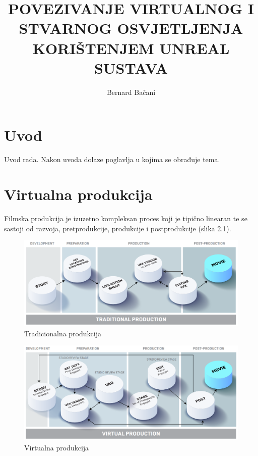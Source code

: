 \documentclass[times, utf8, zavrsni, numeric]{fer}
\begin{document}

\title{POVEZIVANJE VIRTUALNOG I STVARNOG OSVJETLJENJA KORIŠTENJEM UNREAL SUSTAVA}

\author{Bernard Bačani}

\maketitle

\izvornik


\tableofcontents

\chapter{Uvod}
Uvod rada. Nakon uvoda dolaze poglavlja u kojima se obrađuje tema.

\chapter{Virtualna produkcija}
Filmska produkcija je izuzetno kompleksan proces koji je tipično linearan te se sastoji od razvoja, pretprodukcije, produkcije i postprodukcije (slika 2.1).

\begin{figure}[htb]
	\centering
	\includegraphics[width=15cm]{slika 2-1.png}
	\caption{Tradicionalna produkcija \cite{vpguide1}}
\end{figure}

\begin{figure}[htb]
	\centering
	\includegraphics[width=15cm]{slika 2-2.png}
	\caption{Virtualna produkcija \cite{vpguide2}}
\end{figure}
\end{document}
